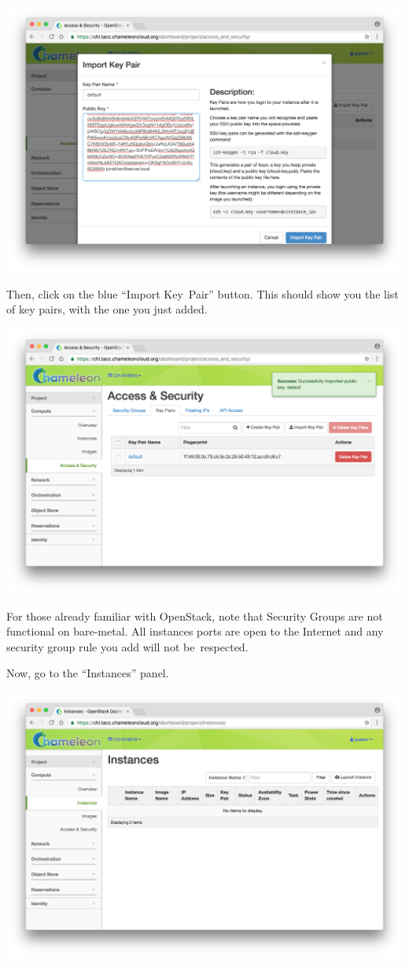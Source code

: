 \includegraphics[width=0.8\columnwidth]{images/chameleon/Screen-Shot-2016-10-26-at-14-37-18.png}

Then, click on the blue ``Import Key~Pair'' button. This should show you
the list of key pairs, with the one you just added.

\includegraphics[width=0.8\columnwidth]{images/chameleon/Screen-Shot-2016-10-26-at-14-37-52.png}

For those already familiar with OpenStack, note that Security Groups are
not functional on bare-metal. All instances ports are open to the
Internet and any security group rule you add will not be~respected.

Now, go to the ``Instances'' panel.

\includegraphics[width=0.8\columnwidth]{images/chameleon/Screen-Shot-2016-10-26-at-14-39-56.png}

